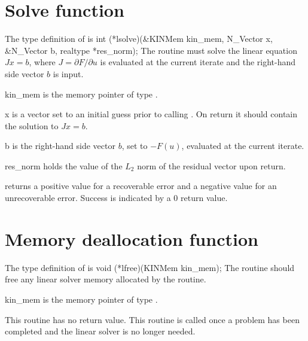 \section{Solve function}
The type definition of  is
{
  int (*lsolve)(&KINMem kin\_mem, N\_Vector x, \\
                &N\_Vector b, realtype *res\_norm);
}
{
  The routine  must solve the linear equation $J x = b$, where         
  $J = \partial F / \partial u$ is evaluated at the current iterate
  and the right-hand side vector $b$ is input. 
}
{
  \begin{args}
  \item[kin\_mem]
    is the {\kinsol} memory pointer of type .
  \item[x]
    is a vector set to an initial guess prior to calling . 
    On return it should contain the solution to $J x = b$.
  \item[b]
    is the right-hand side vector $b$, set to $-F(u)$, evaluated at
    the current iterate.
  \item[res\_norm]
    holds the value of the $L_2$ norm of the residual vector upon return.
  \end{args}
}
{
   returns a positive value    
  for a recoverable error and a negative value for an             
  unrecoverable error. Success is indicated by a $0$ return value.
}
{}


\section{Memory deallocation function}
The type definition of  is
{
  void (*lfree)(KINMem kin\_mem);
}
{
  The routine  should free any linear solver memory
  allocated by the  routine.
}
{
  \begin{args}
  \item[kin\_mem]
    is the {\kinsol} memory pointer of type .
  \end{args}
}
{
  This routine has no return value.
}
{
  This routine is called once a problem has been completed and the 
  linear solver is no longer needed.
}
